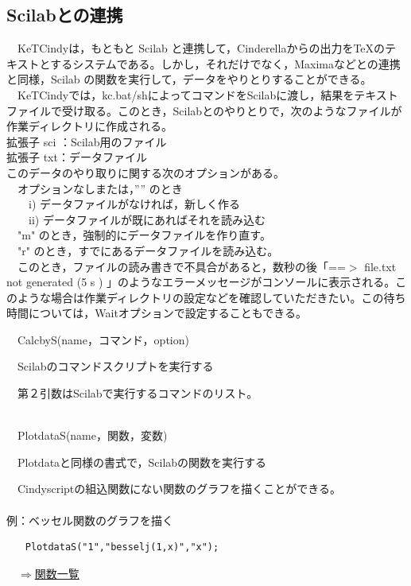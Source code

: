 \documentclass[papersize,a4paper,12pt,uplatex]{jsarticle}
\begin{document}
\subsection{Scilabとの連携}
　KeTCindyは，もともと Scilab と連携して，Cinderellaからの出力をTeXのテキストとするシステムである。しかし，それだけでなく，Maximaなどとの連携と同様，Scilab の関数を実行して，データをやりとりすることができる。\\
　KeTCindyでは，kc.bat/shによってコマンドをScilabに渡し，結果をテキストファイルで受け取る。このとき，Scilabとのやりとりで，次のようなファイルが作業ディレクトリに作成される。\\
拡張子 sci ：Scilab用のファイル\\
拡張子 txt：データファイル\\
このデータのやり取りに関する次のオプションがある。\\
　オプションなしまたは，”” のとき\\
　　i) データファイルがなければ，新しく作る\\
　　ii) データファイルが既にあればそれを読み込む\\
　"m"  のとき，強制的にデータファイルを作り直す。\\
　"r" のとき，すでにあるデータファイルを読み込む。\\ 
　このとき，ファイルの読み書きで不具合があると，数秒の後「==$>$ file.txt not generated (5 s ) 」のようなエラーメッセージがコンソールに表示される。このような場合は作業ディレクトリの設定などを確認していただきたい。この待ち時間については，Waitオプションで設定することもできる。\\

\begin{description}

\hypertarget{calcbyS}{}
\item[関数]　CalcbyS(name，コマンド，option)
\item[機能]　Scilabのコマンドスクリプトを実行する
\item[説明]　第２引数はScilabで実行するコマンドのリスト。\\
　\\
\hypertarget{plotdataS}{}
\item[関数]　PlotdataS(name，関数，変数)
\item[機能]　Plotdataと同様の書式で，Scilabの関数を実行する
\item[説明]　Cindyscriptの組込関数にない関数のグラフを描くことができる。\\
　\\
例：ベッセル関数のグラフを描く
\begin{verbatim}
　　PlotdataS("1","besselj(1,x)","x");
\end{verbatim}

\end{description}
\begin{flushright}　\hyperlink{functionlist}{$\Rightarrow$関数一覧}\end{flushright}
\newpage
\end{document}
